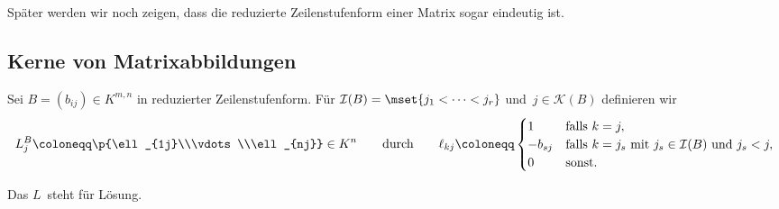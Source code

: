 \documentclass[a4paper]{article}
\begin{document}
Später werden wir noch zeigen, dass die reduzierte Zeilenstufenform einer Matrix sogar eindeutig ist.


\subsection{Kerne von Matrixabbildungen}

\begin{definition}\label{def:ker:basisvec}
    Sei $B = (b_{ij}) \in K^{m,n}$ in reduzierter Zeilenstufenform. Für $\mathcal{I}(B) = \mset{j_1 < \dots < j_r}$ und~$j \in \mathcal{K}(B)$ definieren wir
    \begin{equation*}
        L_j^B \coloneqq \p{\ell_{1j}\\\vdots\\\ell_{nj}} \in K^n
        \qquad\text{durch}\qquad
        \ell_{kj} \coloneqq \begin{cases}
            1       & \text{falls } k = j,                                                            \\
            -b_{sj} & \text{falls } k = j_s \text{ mit } j_s \in \mathcal{I}(B) \text{ und } j_s < j, \\
            0       & \text{sonst}.
        \end{cases}
    \end{equation*}
\end{definition}

Das $L$~steht für Lösung.
\end{document}
